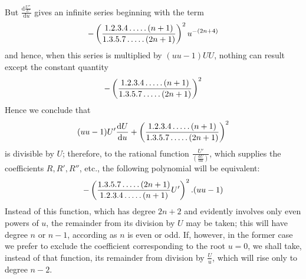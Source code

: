 But $\frac{\mathrm{d}\frac{U''}U}{\mathrm{d}u}$ gives an infinite series beginning with the term
\[
-\left(\frac{1.2.3.4\mathinner{.\,.\,.\,.\,.}(n+1)}
{1.3.5.7\mathinner{.\,.\,.\,.\,.}(2n+1)}\right)^2u^{-(2n+4)}
\]
and hence, when this series is multiplied by $(uu-1)UU$, nothing can result except the constant quantity
\[
-\left(\frac{1.2.3.4\mathinner{.\,.\,.\,.\,.}(n+1)}
{1.3.5.7\mathinner{.\,.\,.\,.\,.}(2n+1)}\right)^2
\]
Hence we conclude that
\[
(uu-1)U'\frac{\mathrm{d}U}{\mathrm{d}u}
+\left(\frac{1.2.3.4\mathinner{.\,.\,.\,.\,.}(n+1)}
{1.3.5.7\mathinner{.\,.\,.\,.\,.}(2n+1)}\right)^2
\]
is divisible by $U$; therefore, to the rational function $\frac{U'}{(\frac{\mathrm{d}U}{\mathrm{d}u})}$, which supplies the coefficients $R,R',R''$, etc., the following polynomial will be equivalent:
\[
-\left(\frac{1.3.5.7\mathinner{.\,.\,.\,.\,.}(2n+1)}
{1.2.3.4\mathinner{.\,.\,.\,.\,.}(n+1)}U'\right)^2.(uu-1)
\]
Instead of this function, which has degree $2n+2$ and evidently involves only even powers of $u$, the remainder from its division by $U$ may be taken; this will have degree $n$ or $n-1$, according as $n$ is even or odd. If, however, in the former case we prefer to exclude the coefficient corresponding to the root $u=0$, we shall take, instead of that function, its remainder from division by $\frac Uu$, which will rise only to degree $n-2$.

